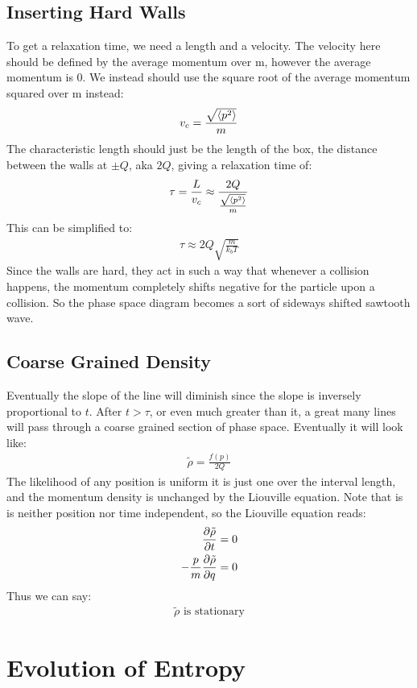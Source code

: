 \documentclass[12pt]{article}
\begin{document}
\subsection{Inserting Hard Walls}
To get a relaxation time, we need a length and a velocity. The velocity here should be defined by the average momentum over m, however the average momentum is $0$. We instead should use the square root of the average momentum squared over m instead:
\begin{align*}
  v_{c}=\frac{\sqrt{\ev{p^2}}}{m}
\end{align*}
The characteristic length should just be the length of the box, the distance between the walls at $\pm Q$, aka $2Q$, giving a relaxation time of:
\begin{align*}
  \tau=\frac{L}{v_c}\approx\frac{2Q}{\frac{\sqrt{\ev{p^2}}}{m}}
\end{align*}
This can be simplified to:
\begin{align}
  \boxed{\tau\approx2Q\sqrt{\frac{m}{k_bT}}}
\end{align}
Since the walls are hard, they act in such a way that whenever a collision happens, the momentum completely shifts negative for the particle upon a collision. So the phase space diagram becomes a sort of sideways shifted sawtooth wave. 
\subsection{Coarse Grained Density}
Eventually the slope of the line will diminish since the slope is inversely proportional to $t$. After $t>\tau$, or even much greater than it, a great many lines will pass through a coarse grained section of phase space. Eventually it will look like:
\begin{align*}
  \tilde{\rho}=\frac{f(p)}{2Q}
\end{align*}
The likelihood of any position is uniform it is just one over the interval length, and the momentum density is unchanged by the Liouville equation. Note that is is neither position nor time independent, so the Liouville equation reads:
\begin{align*}
  \pdv{\tilde{\rho}}{t}&=0\\
  -\frac{p}{m}\pdv{\tilde{\rho}}{q}&=0
\end{align*}
Thus we can say:
\begin{align}
  \boxed{\tilde{\rho}\text{ is stationary}}
\end{align}
\section{Evolution of Entropy}
\end{document}
